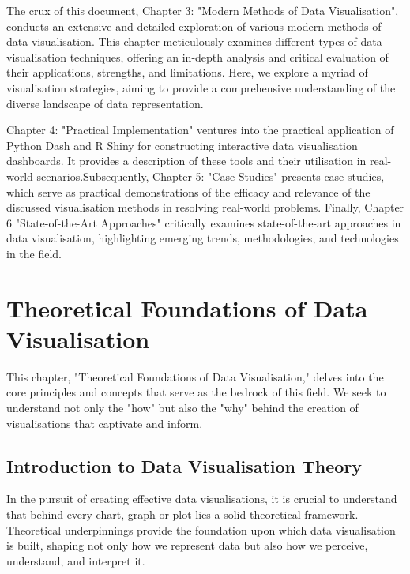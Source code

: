 \documentclass{article}\usepackage[]{graphicx}\usepackage[]{xcolor}
\begin{document}
The crux of this document, Chapter 3: "Modern Methods of Data Visualisation", conducts an extensive and detailed exploration of various modern methods of data visualisation. This chapter meticulously examines different types of data visualisation techniques, offering an in-depth analysis and critical evaluation of their applications, strengths, and limitations. Here, we explore a myriad of visualisation strategies, aiming to provide a comprehensive understanding of the diverse landscape of data representation.

Chapter 4: "Practical Implementation" ventures into the practical application of Python Dash and R Shiny for constructing interactive data visualisation dashboards. It provides a description of these tools and their utilisation in real-world scenarios.Subsequently, Chapter 5: "Case Studies" presents case studies, which serve as practical demonstrations of the efficacy and relevance of the discussed visualisation methods in resolving real-world problems. Finally, Chapter 6 "State-of-the-Art Approaches" critically examines state-of-the-art approaches in data visualisation, highlighting emerging trends, methodologies, and technologies in the field.

\newpage 


\section{Theoretical Foundations of Data Visualisation}
This chapter, "Theoretical Foundations of Data Visualisation," delves into the core principles and concepts that serve as the bedrock of this field. We seek to understand not only the "how" but also the "why" behind the creation of visualisations that captivate and inform.

\subsection{Introduction to Data Visualisation Theory}
In the pursuit of creating effective data visualisations, it is crucial to understand that behind every chart, graph or plot lies a solid theoretical framework. Theoretical underpinnings provide the foundation upon which data visualisation is built, shaping not only how we represent data but also how we perceive, understand, and interpret it.\\ 
\end{document}
